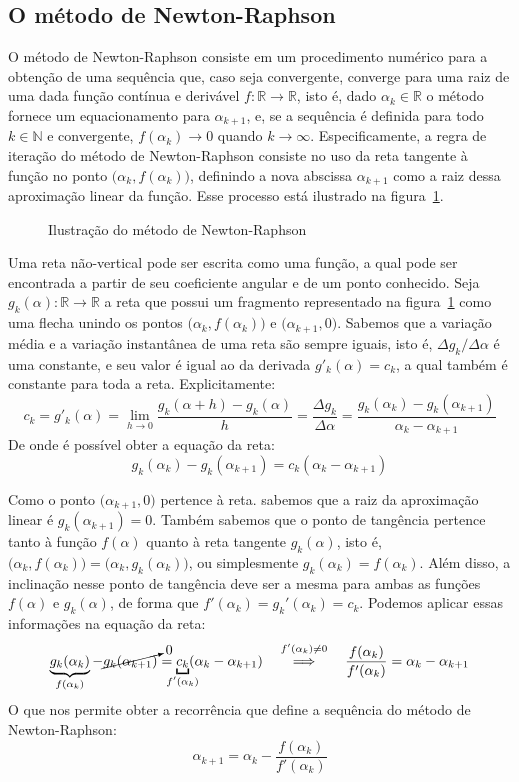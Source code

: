 \subsection*{O método de Newton-Raphson}

O método de Newton-Raphson consiste em um procedimento numérico
para a obtenção de uma sequência que, caso seja convergente,
converge para uma raiz de uma dada função contínua e derivável
$f:\mathds{R}\to\mathds{R}$, isto é,
dado $\alpha_k \in \mathds{R}$ o método fornece
um equacionamento para $\alpha_{k+1}$,
e, se a sequência é definida para todo $k \in \mathds{N}$ e convergente,
$f(\alpha_k) \to 0$ quando $k \to \infty$.
Especificamente,
a regra de iteração do método de Newton-Raphson
consiste no uso da reta tangente à função
no ponto $\big(\alpha_k, f(\alpha_k)\big)$,
definindo a nova abscissa $\alpha_{k+1}$
como a raiz dessa aproximação linear da função.
Esse processo está ilustrado na figura~\ref{fig:newton-raphson}.

\begin{figure}[h!]
  \centering
  
  \caption{Ilustração do método de Newton-Raphson}
  \label{fig:newton-raphson}
\end{figure}

Uma reta não-vertical pode ser escrita como uma função,
a qual pode ser encontrada
a partir de seu coeficiente angular e de um ponto conhecido.
Seja $g_k(\alpha):\mathds{R}\to\mathds{R}$ a reta
que possui um fragmento representado na figura~\ref{fig:newton-raphson}
como uma flecha unindo os pontos
$\big(\alpha_k, f(\alpha_k)\big)$ e $\big(\alpha_{k+1}, 0\big)$.
Sabemos que a variação média e a variação instantânea de uma reta
são sempre iguais, isto é,
$\Delta g_k / \Delta \alpha$ é uma constante,
e seu valor é igual ao da derivada $g'_k(\alpha) = c_k$,
a qual também é constante para toda a reta.
Explicitamente:
\[
  c_k = g'_k(\alpha)
  =
    \lim_{h \to 0}
      \dfrac{g_k(\alpha + h) - g_k(\alpha)}{h}
  =
    \dfrac{\Delta g_k}{\Delta \alpha}
  =
    \dfrac{g_k(\alpha_k) - g_k(\alpha_{k+1})}{\alpha_k - \alpha_{k+1}}
\]
De onde é possível obter a equação da reta:
\[
  g_k(\alpha_k) - g_k(\alpha_{k+1}) =
  c_k(\alpha_k - \alpha_{k+1})
\]

Como o ponto $\big(\alpha_{k+1}, 0\big)$ pertence à reta.
sabemos que a raiz da aproximação linear é $g_k(\alpha_{k+1}) = 0$.
Também sabemos que o ponto de tangência
pertence tanto à função $f(\alpha)$
quanto à reta tangente $g_k(\alpha)$, isto é,
$\big(\alpha_k, f(\alpha_k)\big) = \big(\alpha_k, g_k(\alpha_k)\big)$,
ou simplesmente $g_k(\alpha_k) = f(\alpha_k)$.
Além disso, a inclinação nesse ponto de tangência
deve ser a mesma para ambas as funções $f(\alpha)$ e $g_k(\alpha)$,
de forma que $f'(\alpha_k) = g_k'(\alpha_k) = c_k$.
Podemos aplicar essas informações na equação da reta:
\[
    \underbrace{g_k(\alpha_k)}_{f(\alpha_k)}
    - \cancelto{0}{g_k(\alpha_{k+1})}
  =
    \underbracket[1.1pt]{c_k}_{\mathclap{f'(\alpha_k)}}
    (\alpha_k - \alpha_{k+1})
  \quad\stackfirst{f'(\alpha_k) \ne 0}{\implies}\quad
  \dfrac{f(\alpha_k)}{f'(\alpha_k)} = \alpha_k - \alpha_{k+1}
\]
O que nos permite obter a recorrência
que define a sequência do método de Newton-Raphson:
\[\tag{NR}
  \alpha_{k+1} = \alpha_k - \dfrac{f(\alpha_k)}{f'(\alpha_k)}
\]
